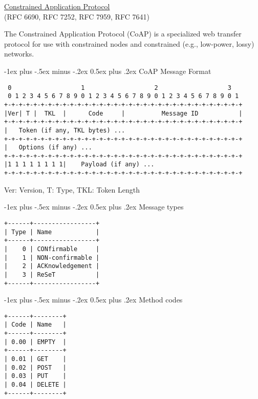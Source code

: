 \documentclass[a4,10pt,landscape]{article}
\makeatletter
\renewcommand{\section}{\@startsection{section}{1}{0mm}%
                                {-1ex plus -.5ex minus -.2ex}%
                                {0.5ex plus .2ex}%
                                {\normalfont\large\bfseries}}
\makeatother
\begin{document}
\raggedright
\footnotesize
\begin{multicols}{3}


\setlength{\premulticols}{1pt}
\setlength{\postmulticols}{1pt}
\setlength{\multicolsep}{1pt}
\setlength{\columnsep}{1pt}

\begin{center}
     \Large{\underline{Constrained Application Protocol}} \\
     {\tiny
       (RFC 6690, RFC 7252, RFC 7959, RFC 7641)
     }
\end{center}

The Constrained Application Protocol (CoAP) is a specialized web
transfer protocol for use with constrained nodes and constrained
(e.g., low-power, lossy) networks.

\section{CoAP Message Format}
{\tiny
\begin{verbatim}
 0                   1                   2                   3
 0 1 2 3 4 5 6 7 8 9 0 1 2 3 4 5 6 7 8 9 0 1 2 3 4 5 6 7 8 9 0 1
+-+-+-+-+-+-+-+-+-+-+-+-+-+-+-+-+-+-+-+-+-+-+-+-+-+-+-+-+-+-+-+-+
|Ver| T |  TKL  |      Code     |          Message ID           |
+-+-+-+-+-+-+-+-+-+-+-+-+-+-+-+-+-+-+-+-+-+-+-+-+-+-+-+-+-+-+-+-+
|   Token (if any, TKL bytes) ...
+-+-+-+-+-+-+-+-+-+-+-+-+-+-+-+-+-+-+-+-+-+-+-+-+-+-+-+-+-+-+-+-+
|   Options (if any) ...
+-+-+-+-+-+-+-+-+-+-+-+-+-+-+-+-+-+-+-+-+-+-+-+-+-+-+-+-+-+-+-+-+
|1 1 1 1 1 1 1 1|    Payload (if any) ...
+-+-+-+-+-+-+-+-+-+-+-+-+-+-+-+-+-+-+-+-+-+-+-+-+-+-+-+-+-+-+-+-+
\end{verbatim}
Ver: Version, T: Type, TKL: Token Length
}

\section{Message types}
{\tiny
\begin{verbatim}
+------+-----------------+
| Type | Name            |
+------+-----------------+
|    0 | CONfirmable     |
|    1 | NON-confirmable |
|    2 | ACKnowledgement |
|    3 | ReSeT           |
+------+-----------------+
\end{verbatim}
}

\section{Method codes}
{\tiny
\begin{verbatim}
+------+--------+
| Code | Name   |
+------+--------+
| 0.00 | EMPTY  |
+------+--------+
| 0.01 | GET    |
| 0.02 | POST   |
| 0.03 | PUT    |
| 0.04 | DELETE |
+------+--------+
\end{verbatim}
}


\end{multicols}
\end{document}
